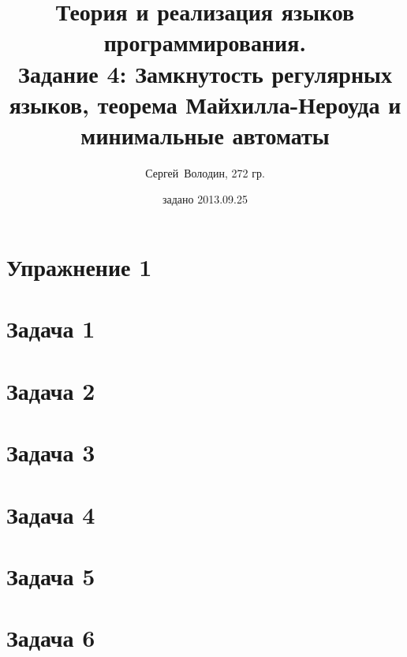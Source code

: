 \documentclass[a4paper]{article}
\title{Теория и реализация языков программирования.\\Задание 4: Замкнутость регулярных языков, теорема Майхилла-Нероуда и минимальные автоматы}
\date{задано 2013.09.25}
\author{Сергей~Володин, 272 гр.}
\begin{document}
\maketitle
\section*{Упражнение 1}
\section*{Задача 1}
\section*{Задача 2}
\section*{Задача 3}
\section*{Задача 4}
\section*{Задача 5}
\section*{Задача 6}
\end{document}
